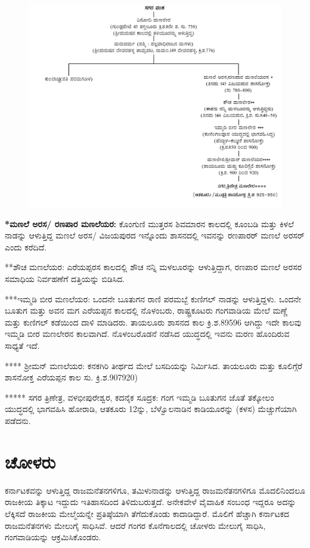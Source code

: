 \begin{figure}[H]
\includegraphics{"images/chap2/1a.jpg"}
\end{figure}

\textbf{*ಮಣಲೆ ಅರಸ/ ರಣಪಾರ ಮಣಲೆಯರ: } ಕೊಂಗುಣಿ ಮುತ್ತರಸ ಶಿವಮಾರನ ಕಾಲದಲ್ಲಿ ಕೂಂಬಡಿ ಮತ್ತು ಕಿಳಲೆ ನಾಡನ್ನು ಆಳುತ್ತಿದ್ದ ಮಣಲೆ ಅರಸ/ ವಿಜಯಪುರದ ಇನ್ನೊಂದು ಶಾಸನದಲ್ಲಿ ಇವನನ್ನು ರಣಪಾರರ್​ ಮಣಲೆ ಅರಸರ್​ ಎಂದು ಕರೆದಿದೆ.

**ಶೌಚ ಮಣಲೆಯರ: ಎರೆಯಪ್ಪರಸ ಕಾಲದಲ್ಲಿ ಶೌಚ ನನ್ನಿ ಮಳಲೂರನ್ನು ಆಳುತ್ತಿದ್ದಾಗ, ರಣಪಾರ ಮಣಲೆ ಅರಸರ ಸಮಾಧಿಯ ನಿರ್ವಹಣೆಗೆ ದತ್ತಿಯನ್ನು ಬಿಡಿಸಿದ.

***ಇಮ್ಮಡಿ ಬೀರ ಮಣಲೆಯರ: ಒಂದನೇ ಬೂತುಗನ ರಾಣಿ ಪರಮಬ್ಬೆ ಕುಣಿಗಲ್​ ನಾಡನ್ನು ಆಳುತ್ತಿದ್ದಳು. ಒಂದನೇ ಬೂತುಗ ಮತ್ತು ಅವನ ಮಗ ಎರೆಯಪ್ಪನ ಕಾಲದಲ್ಲಿ ನೊಳಂಬರು, ರಾಷ್ಟ್ರಕೂಟರು ಗಂಗವಾಡಿಯ ಮೇಲೆ ಮಣ್ಣೆ ಮತ್ತು ಕುಣಿಗಲ್​ ಕಡೆಯಿಂದ ದಾಳಿ ಮಾಡಿದರು. ತಾಯಲೂರು ಶಾಸನದ ಕಾಲ ಕ್ರಿ.ಶ.895\enginline{-}96 ಆಗಿದ್ದು ಇದೇ ಕಾಲವು ಇಮ್ಮಡಿ ಬೀರ ಮಣಲೇರನ ಕಾಲವಾಗಿದೆ. ನೊಳಂಬರೊಡನೆ ನಡೆಸಿದ ಯುದ್ಧದಲ್ಲಿ ಇವನು ಮರಣ ಹೊಂದಿರುವ ಸಾಧ್ಯತೆ ಇದೆ.

**** ಶ‍್ರೀಮನ್​ ಮಣಲೆಯರ: ಕನಕಗಿರಿ ತೀರ್ಥದ ಮೇಲೆ ಬಸದಿಯನ್ನು ನಿರ್ಮಿಸಿದ. ತಾಯಲೂರು ಮತ್ತು ಕೂಲಿಗ್ಗೆರೆ ಶಾಸನೋಕ್ತ ಎರೆಯಪ್ಪನ ಕಾಲ ಸು. ಕ್ರಿ.ಶ.907\enginline{-}920)

***** ಸಗರ ತ್ರಿಣೇತ್ರ, ವಳಭೀಪುರೇಶ್ವರ, ಕದನೈಕ ಸೂದ್ರಕ: ಗಂಗ ಇಮ್ಮಡಿ ಬೂತುಗನ ಜೊತೆ ತಕ್ಕೋಲಂ ಯುದ್ಧದಲ್ಲಿ ಭಾಗವಹಿಸಿ ಹೋರಾಡಿ, ಆತಕೂರು 12ನ್ನು, ಬೆಳ್ವೊಲನಾಡಿನ ಕಾಡಿಯೂರನ್ನು (ಕಳಸ) ಮೆಚ್ಚುಗೆಯಾಗಿ ಪಡೆದನು.


\section{ಚೋಳರು}

ಕರ್ನಾಟಕವನ್ನು ಆಳುತ್ತಿದ್ದ ರಾಜಮನೆತನಗಳಿಗೂ, ತಮಿಳುನಾಡನ್ನು ಆಳುತ್ತಿದ್ದ ರಾಜಮನೆತನಗಳಿಗೂ ಮೊದಲಿನಿಂದಲೂ ರಾಜಕೀಯ ತಿಕ್ಕಾಟ ಇದ್ದುದು ಇತಿಹಾಸದಿಂದ ತಿಳಿದುಬರುತ್ತದೆ. ಅನೇಕವೇಳೆ ವೈವಾಹಿಕ ಸಂಬಂಧ ಇದ್ದರೂ ಅದನ್ನು ಲೆಕ್ಕಿಸದೆ ರಾಜಕೀಯ ಮೇಲ್ಮೆಯನ್ನೇ ಪ್ರತಿಷ್ಠೆಯಾಗಿ ತೆಗೆದುಕೊಂಡು ಕಾದಾಡಿದ್ದಾರೆ. ಮೊಲಿಗೆ ಹೆಚ್ಚಾಗಿ ಕರ್ನಾಟಕದ ರಾಜಮನೆತನಗಳು ಮೇಲುಗೈ ಸಾಧಿಸಿವೆ. ಆದರೆ ಗಂಗರ ಕೊನೆಗಾಲದಲ್ಲಿ ಚೋಳರು ಮೇಲುಗೈ ಸಾಧಿಸಿ, ಗಂಗವಾಡಿಯನ್ನು ಆಕ್ರಮಿಸಿಕೊಂಡರು.

